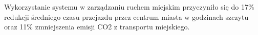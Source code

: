 Wykorzystanie systemu w zarządzaniu ruchem miejskim przyczyniło się do 17\% redukcji średniego czasu przejazdu przez centrum miasta w godzinach szczytu oraz 11\%
zmniejszenia emisji CO2 z transportu miejskiego.

%
%
%
%
